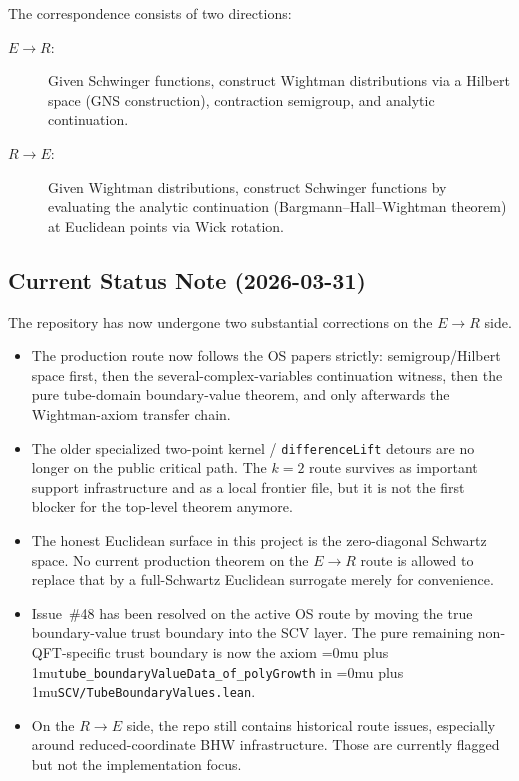\documentclass[11pt,a4paper]{article}
\newcommand{\leanfile}[1]{\begingroup\Urlmuskip=0mu plus 1mu\relax\nolinkurl{#1}\endgroup}
\newcommand{\leanname}[1]{\begingroup\Urlmuskip=0mu plus 1mu\relax\nolinkurl{#1}\endgroup}
\begin{document}
The correspondence consists of two directions:
\begin{description}
\item[$E \to R$:] Given Schwinger functions, construct Wightman distributions
  via a Hilbert space (GNS construction), contraction semigroup, and analytic
  continuation.
\item[$R \to E$:] Given Wightman distributions, construct Schwinger functions
  by evaluating the analytic continuation (Bargmann--Hall--Wightman theorem)
  at Euclidean points via Wick rotation.
\end{description}

\subsection{Current Status Note (2026-03-31)}

The repository has now undergone two substantial corrections on the
$E \to R$ side.

\begin{itemize}
\item The production route now follows the OS papers strictly: semigroup/Hilbert
  space first, then the several-complex-variables continuation witness, then
  the pure tube-domain boundary-value theorem, and only afterwards the
  Wightman-axiom transfer chain.
\item The older specialized two-point kernel / \texttt{differenceLift} detours
  are no longer on the public critical path. The $k=2$ route survives as
  important support infrastructure and as a local frontier file, but it is not
  the first blocker for the top-level theorem anymore.
\item The honest Euclidean surface in this project is the zero-diagonal Schwartz
  space. No current production theorem on the $E \to R$ route is allowed to
  replace that by a full-Schwartz Euclidean surrogate merely for convenience.
\item Issue~\#48 has been resolved on the active OS route by moving the true
  boundary-value trust boundary into the SCV layer. The pure remaining
  non-QFT-specific trust boundary is now the axiom
  \leanname{tube\_boundaryValueData\_of\_polyGrowth} in
  \leanfile{SCV/TubeBoundaryValues.lean}.
\item On the $R \to E$ side, the repo still contains historical route issues,
  especially around reduced-coordinate BHW infrastructure. Those are currently
  flagged but not the implementation focus.
\end{itemize}
\end{document}
